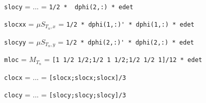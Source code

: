\verb|slocy|  = $...$ = \verb|1/2 *  dphi(2,:) * edet|                       

\verb|slocxx| = $\mu S_{T_n,x}$ = \verb|1/2 * dphi(1,:)' * dphi(1,:) * edet|

\verb|slocyy| = $\mu S_{T_n,y}$ = \verb|1/2 * dphi(2,:)' * dphi(2,:) * edet|

\verb|mloc| = $M_{T_n}$ = \verb|[1 1/2 1/2;1/2 1 1/2;1/2 1/2 1]/12 * edet|

\verb|clocx|  = $...$ =  \verb|[slocx;slocx;slocx]/3|                   

\verb|clocy|  = $...$ =  \verb|[slocy;slocy;slocy]/3|                   



